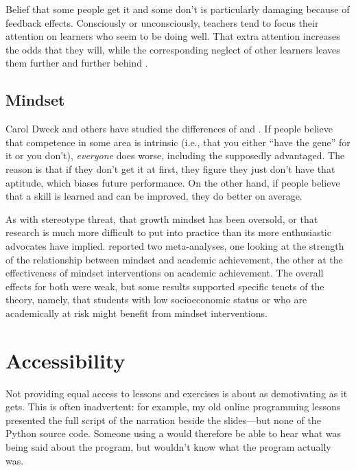 Belief that some people get it and some don't is particularly damaging
because of feedback effects. Consciously or unconsciously, teachers tend
to focus their attention on learners who seem to be doing well. That
extra attention increases the odds that they will, while the
corresponding neglect of other learners leaves them further and further
behind \cite{Alvi1999,Brop1983,Juss2005}.

\subsection*{Mindset}

Carol Dweck and others have studied the differences of
 and
. If people believe that
competence in some area is intrinsic (i.e., that you either ``have the
gene'' for it or you don't), \emph{everyone} does worse, including the
supposedly advantaged. The reason is that if they don't get it at first,
they figure they just don't have that aptitude, which biases future
performance. On the other hand, if people believe that a skill is
learned and can be improved, they do better on average.

As with stereotype threat, 
that growth mindset has been oversold, or that research is much more
difficult to put into practice than its more enthusiastic advocates
have implied. \cite{Sisk2018} reported two meta-analyses, one
looking at the strength of the relationship between mindset and
academic achievement, the other at the effectiveness of mindset
interventions on academic achievement. The overall effects for both
were weak, but some results supported specific tenets of the theory,
namely, that students with low socioeconomic status or who are
academically at risk might benefit from mindset interventions.

\section{Accessibility}\label{s:motivation-accessibility}

Not providing equal access to lessons and exercises is about as
demotivating as it gets. This is often inadvertent: for example, my
old online programming lessons presented the full script of the
narration beside the slides---but none of the Python source
code. Someone using a  would therefore
be able to hear what was being said about the program, but wouldn't
know what the program actually was.

